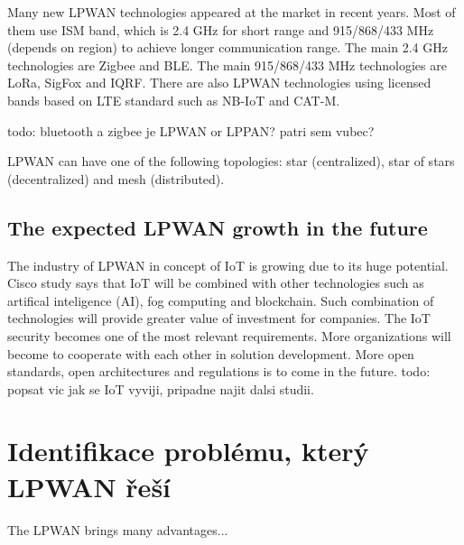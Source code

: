 Many new LPWAN technologies appeared at the market in recent years.
Most of them use ISM band, which is 2.4 GHz for short range and 915/868/433 MHz (depends on region) to achieve longer communication range.
The main 2.4 GHz technologies are Zigbee and BLE.
The main 915/868/433 MHz technologies are LoRa, SigFox and IQRF.
There are also LPWAN technologies using licensed bands based on LTE standard
such as NB-IoT and CAT-M.

todo: bluetooth a zigbee je LPWAN or LPPAN? patri sem vubec?







LPWAN can have one of the following topologies: star (centralized), star of stars (decentralized) and mesh (distributed).
\cite{high density LPWAN}










\section{The expected LPWAN growth in the future}
The industry of LPWAN in concept of IoT is growing due to its huge potential.
Cisco study \cite{IoT cisco study} says that IoT will be combined with other technologies such as artifical inteligence (AI), fog computing and blockchain. Such combination of technologies will provide greater value of investment for companies. 
The IoT security becomes one of the most relevant requirements.
More organizations will become to cooperate with each other in solution development.
More open standards, open architectures and regulations is to come in the future.
todo: popsat vic jak se IoT vyviji, pripadne najit dalsi studii.
















\chapter{Identifikace problému, který LPWAN řeší}
The LPWAN brings many advantages...























